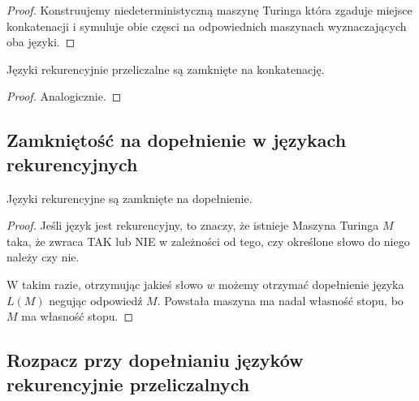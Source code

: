 \begin{proof}
    Konstruujemy niedeterministyczną maszynę Turinga która zgaduje miejsce konkatenacji i symuluje obie częsci na odpowiednich maszynach wyznaczających oba języki.
\end{proof}

\begin{theorem}
    Języki rekurencyjnie przeliczalne są zamknięte na konkatenację.
\end{theorem}

\begin{proof}
    Analogicznie.
\end{proof}

\subsection{Zamkniętość na dopełnienie w językach rekurencyjnych}

\begin{theorem}
    \label{recursive-languages-closed-under-complement}
    Języki rekurencyjne są zamknięte na dopełnienie.
\end{theorem}
\begin{proof}
    Jeśli język jest rekurencyjny, to znaczy, że istnieje Maszyna Turinga \(M\) taka, że zwraca \textsc{TAK} lub \textsc{NIE} w zależności od tego, czy określone słowo do niego należy czy nie.
    
    W takim razie, otrzymując jakieś słowo \(w\) możemy otrzymać dopełnienie języka \(L(M)\) negując odpowiedź \(M\). Powstała maszyna ma nadal własność stopu, bo \(M\) ma własność stopu. 
\end{proof}

\subsection{Rozpacz przy dopełnianiu języków rekurencyjnie przeliczalnych}

